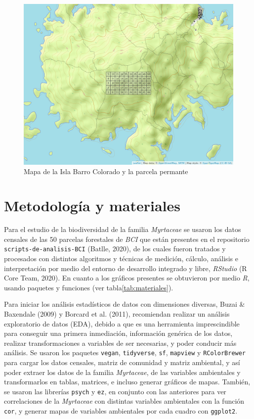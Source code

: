 \documentclass[11pt,]{article}
\begin{document}
\begin{figure}
\centering
\includegraphics[width=1.00000\textwidth]{mapa_cuadros2.png}
\caption{Mapa de la Isla Barro Colorado y la parcela
permante\label{fig:bci_map}}
\end{figure}

\section{Metodología y materiales}\label{metodologuxeda-y-materiales}

Para el estudio de la biodiversidad de la familia \emph{Myrtaceae} se
usaron los datos censales de las 50 parcelas forestales de \emph{BCI}
que están presentes en el repositorio \texttt{scripts-de-analisis-BCI}
(Batlle, 2020), de los cuales fueron tratados y procesados con distintos
algoritmos y técnicas de medición, cálculo, análisis e interpretación
por medio del entorno de desarrollo integrado y libre, \emph{RStudio} (R
Core Team, 2020). En cuanto a los gráficos presentes se obtuvieron por
medio \emph{R}, usando paquetes y funciones (ver
tabla\ref{tab:materiales}).

Para iniciar los análisis estadísticos de datos con dimensiones
diversas, Buzai \& Baxendale (2009) y Borcard et al. (2011), recomiendan
realizar un análisis exploratorio de datos (EDA), debido a que es una
herramienta imprescindible para conseguir una primera inmediación,
información genérica de los datos, realizar transformaciones a variables
de ser necesarias, y poder conducir más análisis. Se usaron los paquetes
\texttt{vegan}, \texttt{tidyverse}, \texttt{sf}, \texttt{mapview} y
\texttt{RColorBrewer} para cargar los datos censales, matriz de
comunidad y matriz ambiental, y así poder extraer los datos de la
familia \emph{Myrtaceae}, de las variables ambientales y transformarlos
en tablas, matrices, e incluso generar gráficos de mapas. También, se
usaron las librerías \texttt{psych} y \texttt{ez}, en conjunto con las
anteriores para ver correlaciones de la \emph{Myrtaceae} con distintas
variables ambientales con la función \texttt{cor}, y generar mapas de
variables ambientales por cada cuadro con \texttt{ggplot2}.
\end{document}
